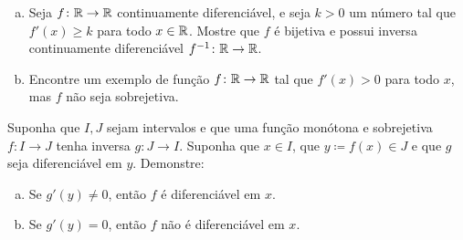 \begin{exercise}
\leavevmode
\begin{enumerate}[a)]
\item
Seja $f \colon {\mathbb{R}} \to {\mathbb{R}}$ continuamente diferenciável, e seja $k>0$ um número tal que $f'(x) \geq k$ para todo $x \in {\mathbb{R}}$. Mostre que $f$ é bijetiva e possui inversa continuamente diferenciável $f^{-1} \colon {\mathbb{R}} \to {\mathbb{R}}$.
\item
Encontre um exemplo de função $f \colon {\mathbb{R}} \to {\mathbb{R}}$ tal que $f'(x)>0$ para todo $x$, mas $f$ não seja sobrejetiva.
\end{enumerate}
\end{exercise}

\begin{exercise}
Suponha que $I,J$ sejam intervalos e que uma função monótona e sobrejetiva $f \colon I \to J$ tenha inversa $g \colon J \to I$. Suponha que $x \in I$, que $y \coloneqq f(x) \in J$ e que $g$ seja diferenciável em $y$. Demonstre:
\begin{enumerate}[a)]
\item
Se $g'(y) \neq 0$, então $f$ é diferenciável em $x$.
\item
Se $g'(y)=0$, então $f$ não é diferenciável em $x$.
\end{enumerate}
\end{exercise}

